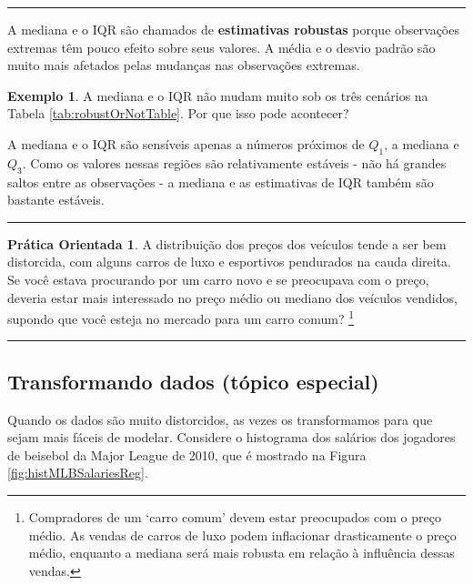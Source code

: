 \documentclass[
]{book}
\theoremstyle{definition}
\theoremstyle{definition}
\newtheorem{example}{Exemplo}[chapter]
\theoremstyle{definition}
\newtheorem{exercise}{Prática Orientada}[chapter]
\theoremstyle{definition}
\theoremstyle{remark}
\begin{document}
\begin{center}\rule{0.5\linewidth}{0.5pt}\end{center}

A mediana e o IQR são chamados de \textbf{estimativas robustas} porque observações extremas têm pouco efeito sobre seus valores. A média e o desvio padrão são muito mais afetados pelas mudanças nas observações extremas.

\begin{example}
\protect\hypertarget{exm:unnamed-chunk-30}{}{\label{exm:unnamed-chunk-30} }A mediana e o IQR não mudam muito sob os três cenários na Tabela \ref{tab:robustOrNotTable}. Por que isso pode acontecer?
\end{example}

A mediana e o IQR são sensíveis apenas a números próximos de \(Q_1\), a mediana e \(Q_3\). Como os valores nessas regiões são relativamente estáveis - não há grandes saltos entre as observações - a mediana e as estimativas de IQR também são bastante estáveis.

\begin{center}\rule{0.5\linewidth}{0.5pt}\end{center}

\begin{exercise}
\protect\hypertarget{exr:unnamed-chunk-31}{}{\label{exr:unnamed-chunk-31} }A distribuição dos preços dos veículos tende a ser bem distorcida, com alguns carros de luxo e esportivos pendurados na cauda direita. Se você estava procurando por um carro novo e se preocupava com o preço, deveria estar mais interessado no preço médio ou mediano dos veículos vendidos, supondo que você esteja no mercado para um carro comum? \footnote{Compradores de um `carro comum' devem estar preocupados com o preço médio. As vendas de carros de luxo podem inflacionar drasticamente o preço médio, enquanto a mediana será mais robusta em relação à influência dessas vendas.}
\end{exercise}

\begin{center}\rule{0.5\linewidth}{0.5pt}\end{center}

\hypertarget{transformingDataSubsection}{%
\subsection{Transformando dados (tópico especial)}\label{transformingDataSubsection}}

Quando os dados são muito distorcidos, as vezes os transformamos para que sejam mais fáceis de modelar. Considere o histograma dos salários dos jogadores de beisebol da Major League de 2010, que é mostrado na Figura \ref{fig:histMLBSalariesReg}.
\end{document}
